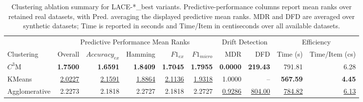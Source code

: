 \begin{table}
\caption{Clustering ablation summary for LACE-*\_best variants. Predictive-performance columns report mean ranks over retained real datasets, with Pred. averaging the displayed predictive mean ranks. MDR and DFD are averaged over synthetic datasets; Time is reported in seconds and Time/Item in centiseconds over all available datasets.}
\label{tab:clustering_ablation_summary}
\begin{tabular}{lrrrrrrrrr}
\toprule
 & \multicolumn{5}{c}{Predictive Performance Mean Ranks} & \multicolumn{2}{c}{Drift Detection} & \multicolumn{2}{c}{Efficiency} \\
\cmidrule(lr){2-6} \cmidrule(lr){7-8} \cmidrule(lr){9-10}
Clustering & Overall & $Accuracy_{ex}$ & Hamming & $F1_{ex}$ & $F1_{micro}$ & MDR & DFD & Time (s) & Time/Item (cs) \\
\midrule
$C^3$M & \textbf{1.7500} & \textbf{1.6591} & \textbf{1.8409} & \textbf{1.7045} & \textbf{1.7955} & \textbf{0.0000} & \textbf{219.43} & 791.81 & 6.28 \\
KMeans & \underline{2.0227} & \underline{2.1591} & \underline{1.8864} & \underline{2.1136} & \underline{1.9318} & 1.0000 & -- & \textbf{567.59} & \textbf{4.45} \\
Agglomerative & 2.2273 & 2.1818 & 2.2727 & 2.1818 & 2.2727 & \underline{0.9286} & \underline{804.00} & \underline{784.82} & \underline{6.13} \\
\bottomrule
\end{tabular}
\end{table}
